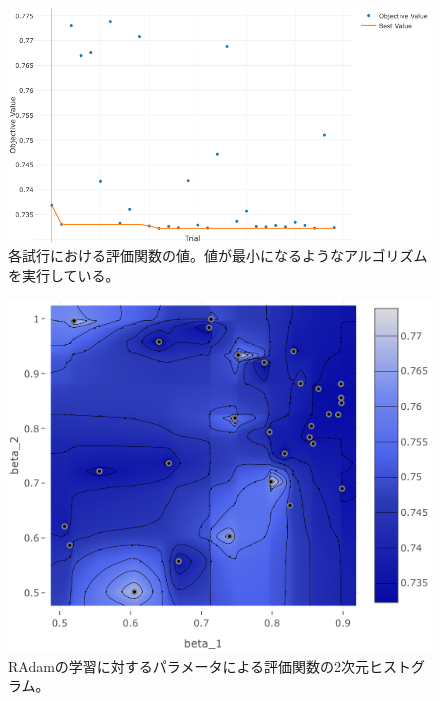 \begin{figure}[H]
	\begin{center}
 \includegraphics[keepaspectratio, scale=0.3]
 	{Figure/Flavortagging/bays1.png}
 		\caption{各試行における評価関数の値。値が最小になるようなアルゴリズムを実行している。}
 		\label{dnnbayes1}
	\end{center}
\end{figure}
\begin{figure}[H]
	\begin{center}
 \includegraphics[keepaspectratio, scale=0.3]
 	{Figure/Flavortagging/bays2.png}
 		\caption{RAdamの学習に対するパラメータによる評価関数の2次元ヒストグラム。}
 		\label{dnnbayes2}
	\end{center}
\end{figure}

